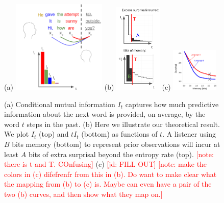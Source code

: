 \documentclass[12pt]{article}
\newcounter{theorem}
\newcommand{\jd}[1]{\textcolor{Red}{[jd: #1]}}
\newcommand{\note}[1]{\textcolor{Red}{[note: #1]}}
\begin{document}
\begin{figure}
	(a)
\includegraphics[width=0.4\textwidth]{figures-gdrive/mi-distance.png}
	(b)
\includegraphics[width=0.2\textwidth]{figures-gdrive/theorem.png}
	(c)
\includegraphics[width=0.2\textwidth]{figures-gdrive/tradeoff.png}
	\caption{
		(a) Conditional mutual information $I_t$ captures how much predictive information about the next word is provided, on average, by the word $t$ steps in the past.
		(b) Here we illustrate our theoretical result. We plot $I_t$ (top) and $tI_t$ (bottom) as functions of $t$. A listener using $B$ bits memory (bottom) to represent prior observations will incur at least $A$ bits of extra surprisal beyond the entropy rate (top). \note{there is t and T. COnfusing}
		(c) \jd{FILL OUT} \note{make the colors in (c) difefrenfr from this in (b). Do want to make clear what the mapping from (b) to (c) is. Maybe can even have a pair of the two (b) curves, and then show what they map on.}
}\label{fig:theorem}
\end{figure}
\end{document}
